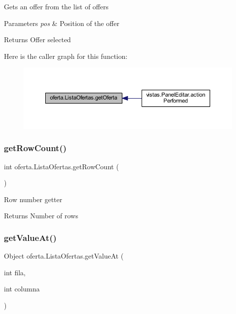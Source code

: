 Gets an offer from the list of offers 
\begin{DoxyParams}{Parameters}
{\em pos} & Position of the offer \\
\hline
\end{DoxyParams}
\begin{DoxyReturn}{Returns}
Offer selected 
\end{DoxyReturn}
Here is the caller graph for this function\+:
\nopagebreak
\begin{figure}[H]
\begin{center}
\leavevmode
\includegraphics[width=350pt]{classoferta_1_1_lista_ofertas_aff266896ffa3bb5682ef4ecf1d514f2e_icgraph}
\end{center}
\end{figure}
\mbox{\label{classoferta_1_1_lista_ofertas_af98f5114e3dc3f259ec55a2ab865c1af}} 
\subsubsection{\texorpdfstring{get\+Row\+Count()}{getRowCount()}}
{\footnotesize\ttfamily int oferta.\+Lista\+Ofertas.\+get\+Row\+Count (\begin{DoxyParamCaption}{ }\end{DoxyParamCaption})}

Row number getter \begin{DoxyReturn}{Returns}
Number of rows 
\end{DoxyReturn}
\mbox{\label{classoferta_1_1_lista_ofertas_a31d3834ba593c933f612572a942fc601}} 
\subsubsection{\texorpdfstring{get\+Value\+At()}{getValueAt()}}
{\footnotesize\ttfamily Object oferta.\+Lista\+Ofertas.\+get\+Value\+At (\begin{DoxyParamCaption}\item[{int}]{fila,  }\item[{int}]{columna }\end{DoxyParamCaption})}

